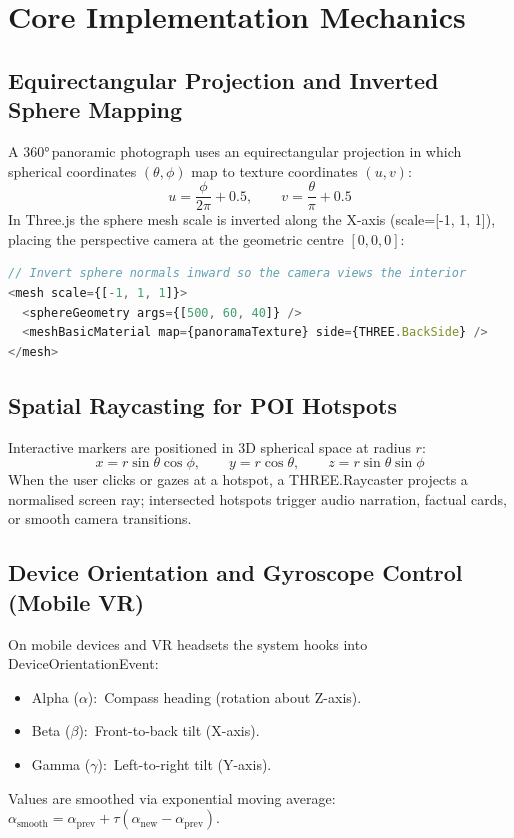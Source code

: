 \documentclass[12pt, a4paper, oneside]{report}
\def\textbf#1{#1}
\def\texttt#1{#1}
\def\&{and}
\begin{document}
\section{Core Implementation Mechanics}

\subsection{Equirectangular Projection \& Inverted Sphere Mapping}

A 360°\,panoramic photograph uses an equirectangular projection in which
spherical coordinates $(\theta,\phi)$ map to texture coordinates $(u,v)$:
\begin{equation}
  u = \frac{\phi}{2\pi} + 0.5, \qquad v = \frac{\theta}{\pi} + 0.5
\end{equation}
In Three.js the sphere mesh scale is inverted along the X-axis
(\texttt{scale={[-1, 1, 1]}}), placing the perspective camera at the
geometric centre $[0,0,0]$:

\begin{lstlisting}[language=JavaScript,
  caption={Equirectangular Sphere Mapping in Three.js}]
// Invert sphere normals inward so the camera views the interior
<mesh scale={[-1, 1, 1]}>
  <sphereGeometry args={[500, 60, 40]} />
  <meshBasicMaterial map={panoramaTexture} side={THREE.BackSide} />
</mesh>
\end{lstlisting}

\subsection{Spatial Raycasting for POI Hotspots}

Interactive markers are positioned in 3D spherical space at radius $r$:
\begin{equation}
  x = r\sin\theta\cos\phi, \qquad y = r\cos\theta, \qquad z = r\sin\theta\sin\phi
\end{equation}
When the user clicks or gazes at a hotspot, a \texttt{THREE.Raycaster} projects
a normalised screen ray; intersected hotspots trigger audio narration, factual
cards, or smooth camera transitions.

\subsection{Device Orientation \& Gyroscope Control (Mobile VR)}

On mobile devices and VR headsets the system hooks into \texttt{DeviceOrientationEvent}:
\begin{itemize}
  \item \textbf{Alpha ($\alpha$):}\ Compass heading (rotation about Z-axis).
  \item \textbf{Beta  ($\beta$):}\ Front-to-back tilt (X-axis).
  \item \textbf{Gamma ($\gamma$):}\ Left-to-right tilt (Y-axis).
\end{itemize}
Values are smoothed via exponential moving average:
$\alpha_{\text{smooth}} = \alpha_{\text{prev}} + \tau(\alpha_{\text{new}} - \alpha_{\text{prev}})$.
\end{document}

